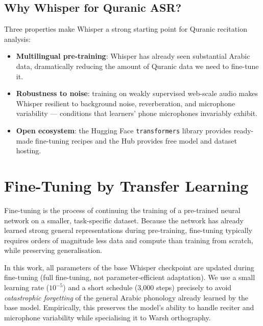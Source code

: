 \subsection{Why Whisper for Quranic ASR?}

Three properties make Whisper a strong starting point for Quranic
recitation analysis:
\begin{itemize}
  \item \textbf{Multilingual pre-training}: Whisper has already seen
        substantial Arabic data, dramatically reducing the amount of
        Quranic data we need to fine-tune it.
  \item \textbf{Robustness to noise}: training on weakly supervised
        web-scale audio makes Whisper resilient to background noise,
        reverberation, and microphone variability --- conditions that
        learners' phone microphones invariably exhibit.
  \item \textbf{Open ecosystem}: the Hugging Face \texttt{transformers}
        library provides ready-made fine-tuning recipes and the Hub
        provides free model and dataset hosting.
\end{itemize}

\section{Fine-Tuning by Transfer Learning}
\label{sec:mt_finetune}

\begin{emeraldbox}[title=Fine-Tuning]
Fine-tuning is the process of continuing the training of a pre-trained
neural network on a smaller, task-specific dataset. Because the network
has already learned strong general representations during pre-training,
fine-tuning typically requires orders of magnitude less data and compute
than training from scratch, while preserving generalisation.
\end{emeraldbox}

In this work, all parameters of the base Whisper checkpoint are updated
during fine-tuning (full fine-tuning, not parameter-efficient adaptation).
We use a small learning rate ($10^{-5}$) and a short schedule (3{,}000
steps) precisely to avoid \emph{catastrophic forgetting} of the general
Arabic phonology already learned by the base model. Empirically, this
preserves the model's ability to handle reciter and microphone variability
while specialising it to Warsh orthography.

